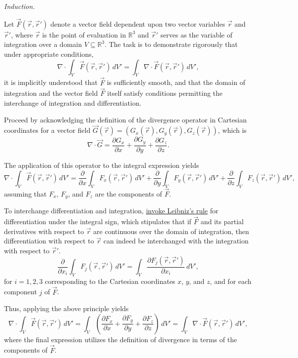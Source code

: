 \documentclass[12pt]{article}
\begin{document}
\textit{Induction.}

Let \(\vec{F}(\vec{r}, \vec{r}')\) denote a vector field dependent upon two vector variables \(\vec{r}\) and \(\vec{r}'\), where \(\vec{r}\) is the point of evaluation in \(\mathbb{R}^3\) and \(\vec{r}'\) serves as the variable of integration over a domain \(V \subseteq \mathbb{R}^3\). The task is to demonstrate rigorously that under appropriate conditions,
\[
\nabla \cdot \int_V \vec{F}(\vec{r}, \vec{r}') \, dV' = \int_V \nabla \cdot \vec{F}(\vec{r}, \vec{r}') \, dV',
\]
it is implicitly understood that \(\vec{F}\) is sufficiently smooth, and that the domain of integration and the vector field \(\vec{F}\) itself satisfy conditions permitting the interchange of integration and differentiation.

Proceed by acknowledging the definition of the divergence operator in Cartesian coordinates for a vector field \(\vec{G}(\vec{r}) = (G_x(\vec{r}), G_y(\vec{r}), G_z(\vec{r}))\), which is
\[
\nabla \cdot \vec{G} = \frac{\partial G_x}{\partial x} + \frac{\partial G_y}{\partial y} + \frac{\partial G_z}{\partial z}.
\]

The application of this operator to the integral expression yields
\[
\nabla \cdot \int_V \vec{F}(\vec{r}, \vec{r}') \, dV' = \frac{\partial}{\partial x} \int_V F_x(\vec{r}, \vec{r}') \, dV' + \frac{\partial}{\partial y} \int_V F_y(\vec{r}, \vec{r}') \, dV' + \frac{\partial}{\partial z} \int_V F_z(\vec{r}, \vec{r}') \, dV',
\]
assuming that \(F_x\), \(F_y\), and \(F_z\) are the components of \(\vec{F}\).

To interchange differentiation and integration, \underline{invoke Leibniz’s rule} for differentiation under the integral sign, which stipulates that if \(\vec{F}\) and its partial derivatives with respect to \(\vec{r}\) are continuous over the domain of integration, then differentiation with respect to \(\vec{r}\) can indeed be interchanged with the integration with respect to \(\vec{r}'\).
\[
\frac{\partial}{\partial x_i} \int_V F_j(\vec{r}, \vec{r}') \, dV' = \int_V \frac{\partial F_j(\vec{r}, \vec{r}')}{\partial x_i} \, dV',
\]
for \(i = 1, 2, 3\) corresponding to the Cartesian coordinates \(x\), \(y\), and \(z\), and for each component \(j\) of \(\vec{F}\).

Thus, applying the above principle yields
\[
\nabla \cdot \int_V \vec{F}(\vec{r}, \vec{r}') \, dV' = \int_V \left(\frac{\partial F_x}{\partial x} + \frac{\partial F_y}{\partial y} + \frac{\partial F_z}{\partial z}\right) \, dV' = \int_V \nabla \cdot \vec{F}(\vec{r}, \vec{r}') \, dV',
\]
where the final expression utilizes the definition of divergence in terms of the components of \(\vec{F}\).
\end{document}
